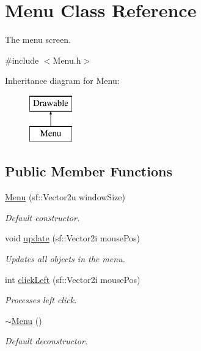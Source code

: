 \hypertarget{class_menu}{}\section{Menu Class Reference}
\label{class_menu}


The menu screen.  




{\ttfamily \#include $<$Menu.\+h$>$}

Inheritance diagram for Menu\+:\begin{figure}[H]
\begin{center}
\leavevmode
\includegraphics[height=2.000000cm]{class_menu}
\end{center}
\end{figure}
\subsection*{Public Member Functions}
\begin{DoxyCompactItemize}
\item 
\hyperlink{class_menu_aea3a4bfcab09d8220876bf91123fd154}{Menu} (sf\+::\+Vector2u window\+Size)
\begin{DoxyCompactList}\small\item\em Default constructor. \end{DoxyCompactList}\item 
void \hyperlink{class_menu_a67abbf2a4f0588e19290b62fbdc690a3}{update} (sf\+::\+Vector2i mouse\+Pos)
\begin{DoxyCompactList}\small\item\em Updates all objects in the menu. \end{DoxyCompactList}\item 
int \hyperlink{class_menu_a199db779b92cfd8eeedbf504ef554fc5}{click\+Left} (sf\+::\+Vector2i mouse\+Pos)
\begin{DoxyCompactList}\small\item\em Processes left click. \end{DoxyCompactList}\item 
\hyperlink{class_menu_a831387f51358cfb88cd018e1777bc980}{$\sim$\+Menu} ()
\begin{DoxyCompactList}\small\item\em Default deconstructor. \end{DoxyCompactList}\end{DoxyCompactItemize}
